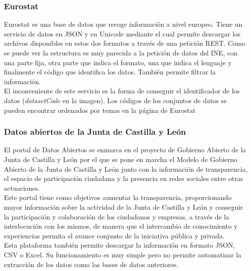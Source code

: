 \subsubsection{Eurostat}
Eurostat es una base de datos que recoge información a nivel europeo. Tiene un servicio de datos en JSON y en Unicode mediante el cual permite descargar los archivos disponibles en estos dos formatos a través de una petición REST.
\cite{eurostat}
Como se puede ver la estructura es muy parecida a la petición de datos del INE, con una parte fija, otra parte que indica el formato, una que indica el lenguaje y finalmente el código que identifica los datos. También permite filtrar la información.\\
El inconveniente de este servicio es la forma de conseguir el identificador de los datos (\textit{datasetCode} en la imagen).
Los códigos de los conjuntos de datos se pueden encontrar ordenados por temas en la página de Eurostat
\subsubsection{Datos abiertos de la Junta de Castilla y León}
El portal de Datos Abiertos se enmarca en el proyecto de Gobierno Abierto de la Junta de Castilla y León por el que se pone en marcha el Modelo de Gobierno Abierto de la Junta de Castilla y León junto con la información de transparencia, el espacio de participación ciudadana   y la presencia en redes sociales entre otras actuaciones.\\
Este portal tiene como objetivos aumentar la transparencia, proporcionando mayor información sobre la actividad de la Junta de Castilla y León y conseguir la participación y colaboración de los ciudadanos y empresas, a través de la interlocución con los mismos, de manera que el intercambio de conocimiento y experiencias permita el avance conjunto de la iniciativa pública y privada.\cite{datosab}\\
Esta plataforma también permite descargar la información en formato JSON, CSV o Excel. Su funcionamiento es muy simple pero no permite automatizar la extracción de los datos como las bases de datos anteriores.
